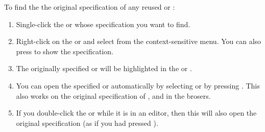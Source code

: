 To find the the original specification of any reused \gdcase{} or \gdsuite{}:
\begin{enumerate}
\item Single-click the \gdcase{} or \gdsuite{} whose specification you want to find.
\item Right-click on the \gdcase{} or \gdsuite{} and select  from the context-sensitive menu. You can also press  to show the specification.
\item The originally specified  \gdcase{} or \gdsuite{} will be highlighted in the \gdtestcasebrowser{} or \gdtestsuitebrowser{}. 
\item You can open the specified \gdcase{} or \gdsuite{} automatically by selecting  or by  pressing . This also works on the original specification of \gdcases{}, \gdsuites{} and \gdjobs{} in the brosers. 
\item If you double-click the \gdcase{} or \gdsuite{} while it is in an editor, then this will also open the original specification (as if you had pressed ).
\end{enumerate}
